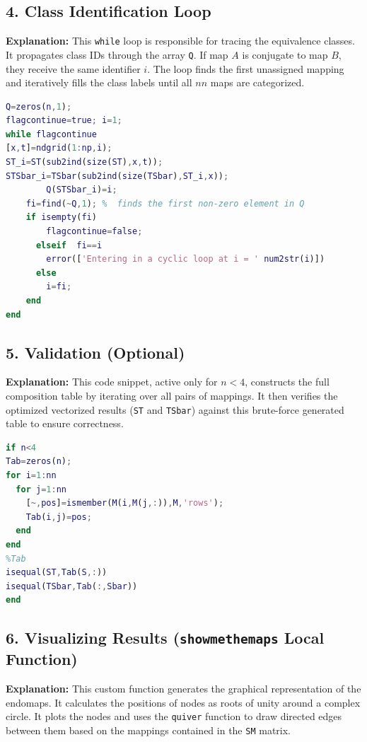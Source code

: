 \subsection{4. Class Identification Loop}
\textbf{Explanation:} This \texttt{while} loop is responsible for tracing the equivalence classes. It propagates class IDs through the array \texttt{Q}. If map $A$ is conjugate to map $B$, they receive the same identifier $i$. The loop finds the first unassigned mapping and iteratively fills the class labels until all $nn$ maps are categorized.

\begin{lstlisting}[language=Matlab]
Q=zeros(n,1);
flagcontinue=true; i=1;
while flagcontinue
[x,t]=ndgrid(1:np,i);
ST_i=ST(sub2ind(size(ST),x,t));
STSbar_i=TSbar(sub2ind(size(TSbar),ST_i,x));
        Q(STSbar_i)=i;
    fi=find(~Q,1); %  finds the first non-zero element in Q
    if isempty(fi)
        flagcontinue=false;
      elseif  fi==i
        error(['Entering in a cyclic loop at i = ' num2str(i)])
      else
        i=fi;
    end
end
\end{lstlisting}

\subsection{5. Validation (Optional)}
\textbf{Explanation:} This code snippet, active only for $n<4$, constructs the full composition table by iterating over all pairs of mappings. It then verifies the optimized vectorized results (\texttt{ST} and \texttt{TSbar}) against this brute-force generated table to ensure correctness. 

\begin{lstlisting}[language=Matlab]
if n<4
Tab=zeros(n);
for i=1:nn
  for j=1:nn
    [~,pos]=ismember(M(i,M(j,:)),M,'rows');
    Tab(i,j)=pos;
  end
end
%Tab
isequal(ST,Tab(S,:))
isequal(TSbar,Tab(:,Sbar))
end
\end{lstlisting}

\subsection{6. Visualizing Results (\texttt{showmethemaps} Local Function)}
\textbf{Explanation:} This custom function generates the graphical representation of the endomaps. It calculates the positions of nodes as roots of unity around a complex circle. It plots the nodes and uses the \texttt{quiver} function to draw directed edges between them based on the mappings contained in the \texttt{SM} matrix.

